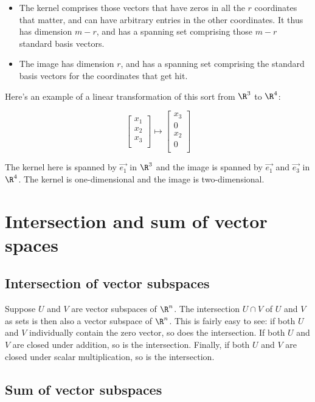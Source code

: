 \documentclass[10pt]{amsart}
\begin{document}
\begin{itemize}
\item The kernel comprises those vectors that have zeros in all the
  $r$ coordinates that matter, and can have arbitrary entries in the
  other coordinates. It thus has dimension $m - r$, and has a spanning
  set comprising those $m - r$ standard basis vectors.
\item The image has dimension $r$, and has a spanning set comprising
  the standard basis vectors for the coordinates that get hit.
\end{itemize}

Here's an example of a linear transformation of this sort from $\R^3$
to $\R^4$:

$$\left[\begin{matrix} x_1 \\ x_2 \\ x_3 \\\end{matrix}\right] \mapsto \left[ \begin{matrix} x_3 \\ 0 \\ x_2 \\ 0 \\\end{matrix}\right]$$

The kernel here is spanned by $\vec{e_1}$ in $\R^3$ and the image is
spanned by $\vec{e_1}$ and $\vec{e_3}$ in $\R^4$. The kernel is
one-dimensional and the image is two-dimensional.

\section{Intersection and sum of vector spaces}

\subsection{Intersection of vector subspaces}

Suppose $U$ and $V$ are vector subspaces of $\R^n$. The intersection
$U \cap V$ of $U$ and $V$ as sets is then also a vector subspace of
$\R^n$. This is fairly easy to see: if both $U$ and $V$ individually
contain the zero vector, so does the intersection. If both $U$ and $V$
are closed under addition, so is the intersection. Finally, if both
$U$ and $V$ are closed under scalar multiplication, so is the
intersection.
\subsection{Sum of vector subspaces}
\end{document}
